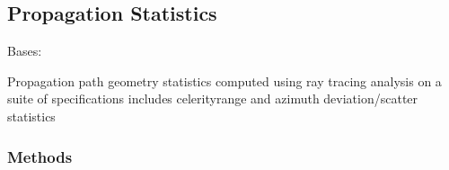 \documentclass[letterpaper,10pt,english]{sphinxmanual}
\begin{document}
\subsection{Propagation Statistics}
\label{\detokenize{stochprop.propagation:module-stochprop.propagation}}\label{\detokenize{stochprop.propagation:propagation-statistics}}\label{\detokenize{stochprop.propagation::doc}}

\begin{fulllineitems}
\label{\detokenize{stochprop.propagation:stochprop.propagation.PathGeometryModel}}
\sphinxAtStartPar
Bases: 

\sphinxAtStartPar
Propagation path geometry statistics computed using ray tracing
analysis on a suite of specifications includes celerity\sphinxhyphen{}range and
azimuth deviation/scatter statistics
\subsubsection*{Methods}


\begin{savenotes}\sphinxatlongtablestart\begin{longtable}[c]{}
\hline

\endfirsthead

%
{}\\
\hline

\endhead

\hline
{}\\
\endfoot

\endlastfoot


\end{longtable}
\end{savenotes}
\end{fulllineitems}
\end{document}
